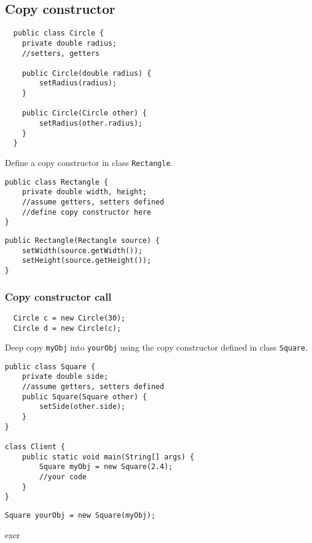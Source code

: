\clearpage
\subsection{Copy constructor}
  \begin{lstlisting}
  public class Circle {
  	private double radius;
  	//setters, getters
 
  	public Circle(double radius) {
		setRadius(radius);
  	}
	
	public Circle(Circle other) {
		setRadius(other.radius);
  	}
  }
  \end{lstlisting}   
  
\begin{exercise}
Define a copy constructor in class \texttt{Rectangle}. 

\begin{lstlisting}[frame=single,style=buggy]
public class Rectangle {
	private double width, height;
	//assume getters, setters defined
	//define copy constructor here
}
\end{lstlisting}  	
\end{exercise} 
\begin{answer} \begin{lstlisting}
public Rectangle(Rectangle source) {
	setWidth(source.getWidth());
	setHeight(source.getHeight());
}
\end{lstlisting} \end{answer}

\subsubsection{Copy constructor call} 
  \begin{lstlisting}
  Circle c = new Circle(30);
  Circle d = new Circle(c);
  \end{lstlisting} 

\begin{exercise}
Deep copy \texttt{myObj} into \texttt{yourObj} using the copy constructor defined in class \texttt{Square}. 

\begin{lstlisting}[frame=single,style=buggy]
public class Square {
	private double side;
	//assume getters, setters defined
	public Square(Square other) {
		setSide(other.side);
	}
}

class Client {
	public static void main(String[] args) {
		Square myObj = new Square(2.4);
		//your code
	}
}
\end{lstlisting}  	
\end{exercise}
\begin{answer} \begin{lstlisting}
Square yourObj = new Square(myObj);
\end{lstlisting} \end{answer}

exer

